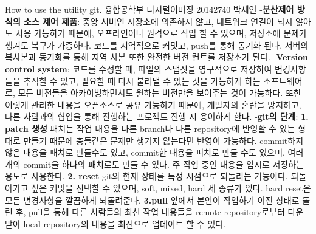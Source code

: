 \documentclass[15pt]{article}
\begin{document}
{\Large \hspace{2cm} How to use the utility git.}\newline
{\hspace*{8.3cm}융합공학부 디지털이미징}\newline
{\hspace*{9.6cm}20142740 박세인}
\newline\newline
-\textbf{분산제어 방식의 소스 제어 제품}:  \newline
중앙 서버인 저장소에 의존하지 않고, 네트워크 연결이 되지 않아도 사용 가능하기 때문에, 오프라인이나 원격으로 작업 할 수 있으며, 저장소에 문제가 생겨도 복구가 가증하다. 코드를 지역적으로 커밋고, push를 통해 동기화 된다. 서버의 복사본과 동기화를 통해 지역 사본 또한 완전한 버전 컨트롤 저장소가 된다. 
\newline\newline -\textbf{Version control system}: \newline
코드를 수정할 때, 파일의 스냅샷을 영구적으로 저장하여 변경사항들을 추적할 수 있고, 필요할 때 다시 불러낼 수 있는 것을 가능하게 하는 소프트웨어로, 모든 버전들을 아카이빙하면서도 원하는 버전만을 보여주는 것이 가능하다. 또한 이렇게 관리한 내용을 오픈소스로 공유 가능하기 때문에, 개발자의 혼란을 방지하고, 다른 사람과의 협업을 통해 진행하는 프로젝트 진행 시 용이하게 한다.
\newline\newline
-\textbf{git의 단계}:\newline
\textbf{1. patch 생성}\newline
패치는 작업 내용을 다른 branch나 다른 repository에 반영할 수 있는 형태로 만들기 때문에 충돌같은 문제만 생기지 않는다면 반영이 가능하다. commit하지 않은 내용을 패치로 만들수도 있고, commit한 내용을 피치로 만들 수도 있으며, 여러개의 commit을 하나의 패치로도 만들 수 있다. 주 작업 중인 내용을 임시로 저장하는 용도로 사용한다.\newline\newline
\textbf{2. reset}\newline
git의 현재 상태를 특정 시점으로 되돌리는 기능이다. 되돌아가고 싶은 커밋을 선택할 수 있으며, soft, mixed, hard 세 종류가 있다. hard reset은 모든 변경사항을 깔끔하게 되돌려준다.\newline\newline
\textbf{3.pull}\newline
앞에서 본인이 작업하기 이전 상태로 돌린 후, pull을 통해 다른 사람들의 최신 작업 내용들을 remote repository로부터 다운받아 local repository의 내용을 최신으로 업데이트 할 수 있다.\newline\newline
\end{document}
